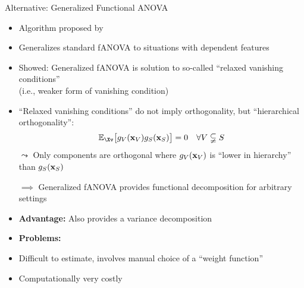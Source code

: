 \documentclass[10pt,compress,t,notes=noshow, xcolor=table]{beamer}
\begin{document}
\begin{frame}{Alternative: Generalized Functional ANOVA}

\begin{itemize}
    \item Algorithm proposed by 
    \item Generalizes standard fANOVA to situations with dependent features
    \pause
    \item Showed: Generalized fANOVA is solution to so-called ``relaxed vanishing conditions'' \\
    (i.e., weaker form of vanishing condition) \\
    \item ``Relaxed vanishing conditions'' do not imply orthogonality, but ``hierarchical orthogonality'':
    $$
    \mathbb{E}_{\Xv} \bigl[ g_{V}(\xv_V) g_{S}(\xv_S) \bigr] = 0 \quad \forall V \subsetneqq S
    $$
    \pause
    $\leadsto$ Only components are orthogonal where $g_{V}(\mathbf{x}_V)$ is ``lower in hierarchy'' than $g_{S}(\mathbf{x}_S)$
    \item[$\implies$] Generalized fANOVA provides functional decomposition for arbitrary settings
    \item \textbf{Advantage:} Also provides a variance decomposition
    \pause
    \item \textbf{Problems:}
    \item Difficult to estimate, involves manual choice of a ``weight function''
    \item Computationally very costly
    
\end{itemize}



    
\end{frame}
\end{document}
